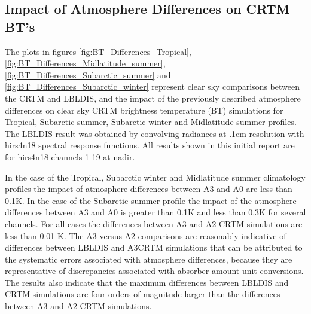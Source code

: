 \subsection{Impact of Atmosphere Differences on CRTM BT's}

The plots in figures \ref{fig:BT_Differences_Tropical}, \ref{fig:BT_Differences_Midlatitude_summer}, \ref{fig:BT_Differences_Subarctic_summer} and \ref{fig:BT_Differences_Subarctic_winter} represent clear sky comparisons between the CRTM and LBLDIS, and the impact of the previously described atmosphere differences on clear sky CRTM brightness temperature (BT) simulations for Tropical, Subarctic summer, Subarctic winter and Midlatitude summer profiles. The LBLDIS result was obtained by convolving radiances at .1cm resolution with hirs4\textunderscore{}n18 spectral response functions. All results shown in this initial report are for hirs4\textunderscore{}n18 channels 1-19 at nadir.

In the case of the Tropical, Subarctic winter and Midlatitude summer climatology profiles the impact of atmosphere differences between A3 and A0 are less than 0.1K. In the case of the Subarctic summer profile the impact of the atmosphere differences between A3 and A0 is greater than 0.1K and less than 0.3K for several channels. For all cases the differences between A3 and A2 CRTM simulations are less than 0.01 K. The A3 versus A2 comparisons are reasonably indicative of differences between LBLDIS and A3\textunderscore{}CRTM simulations that can be attributed to the systematic errors associated with atmosphere differences, because they are representative of discrepancies associated with absorber amount unit conversions. The results also indicate that the maximum differences between LBLDIS and CRTM simulations are four orders of magnitude larger than the differences between A3 and A2 CRTM simulations. 

